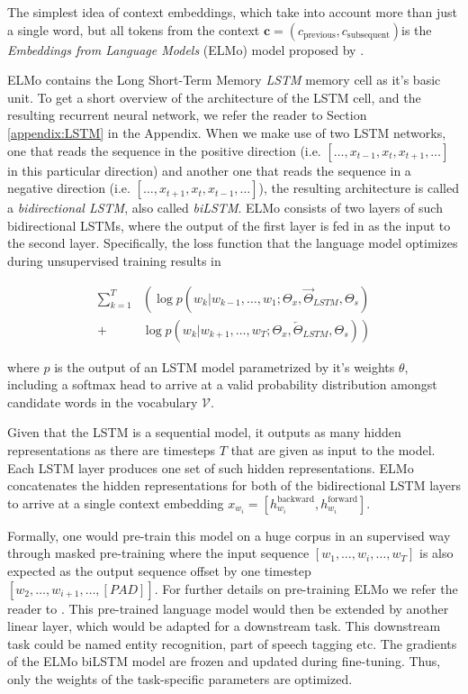 \documentclass[a4paper,12pt,twoside,openright]{report}
\begin{document}
The simplest idea of context embeddings, which take into account more than just a single word, but all tokens from the context $\mathbf{c} = (c_\text{previous}, c_\text{subsequent}) $is the \textit{Embeddings from Language Models} (ELMo) model proposed by \cite{peters17b}.

ELMo contains the Long Short-Term Memory \textit{LSTM} memory cell as it's basic unit.
To get a short overview of the architecture of the LSTM cell, and the resulting recurrent neural network, we refer the reader to Section \ref{appendix:LSTM} in the Appendix.
When we make use of two LSTM networks, one that reads the sequence in the positive direction (i.e. $[\ldots, x_{t-1}, x_t, x_{t+1}, \ldots]$ in this particular direction) and another one that reads the sequence in a negative direction (i.e. $[\ldots, x_{t+1}, x_t, x_{t-1}, \ldots]$), the resulting architecture is called a \textit{bidirectional LSTM}, also called \textit{biLSTM}.
ELMo consists of two layers of such bidirectional LSTMs, where the output of the first layer is fed in as the input to the second layer.
Specifically, the loss function that the language model optimizes during unsupervised training results in 

\begin{align} 
\sum_{k=1}^{T} &\left(\log p\left(w_{k} | w_{k-1}, \ldots, w_{1} ; \Theta_{x}, \vec{\Theta}_{L S T M}, \Theta_{s}\right)\right.\\
+&\left.\log p\left(w_{k} | w_{k+1}, \ldots, w_{T}; \Theta_{x}, \overleftarrow{\Theta}_{L S T M}, \Theta_{s}\right)\right) 
\end{align}

where $p$ is the output of an LSTM model parametrized by it's weights $\theta$, including a softmax head to arrive at a valid probability distribution amongst candidate words in the vocabulary $\mathcal{V}$.

Given that the LSTM is a sequential model, it outputs as many hidden representations as there are timesteps $T$ that are given as input to the model. 
Each LSTM layer produces one set of such hidden representations.
ELMo concatenates the hidden representations for both of the bidirectional LSTM layers to arrive at a single context embedding $x_{w_i} = [h^\text{backward}_{w_i}, h^\text{forward}_{w_i}]$.


Formally, one would pre-train this model on a huge corpus in an supervised way through masked pre-training where the input sequence $[w_1, \ldots , w_i, \ldots, w_T]$ is also expected as the output sequence offset by one timestep $[w_2, \ldots, w_{i+1}, \ldots , [PAD] ]$.
For further details on pre-training ELMo we refer the reader to \cite{jozefowicz16}.
This pre-trained language model would then be extended by another linear layer, which would be adapted for a downstream task.
This downstream task could be named entity recognition, part of speech tagging etc.
The gradients of the ELMo biLSTM model are frozen and updated during fine-tuning.
Thus, only the weights of the task-specific parameters are optimized. 
\end{document}
